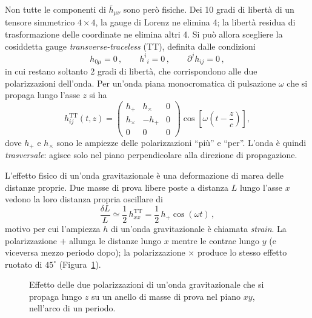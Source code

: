 Non tutte le componenti di $\bar{h}_{\mu\nu}$ sono però fisiche. Dei 10 gradi di libertà di un tensore simmetrico $4\times4$, la gauge di Lorenz ne elimina 4; la libertà residua di trasformazione delle coordinate ne elimina altri 4. Si può allora scegliere la cosiddetta gauge \textit{transverse-traceless} (TT), definita dalle condizioni~\cite{Maggiore2008}
\begin{equation}
    h_{0\mu} = 0\, , \qquad h^{i}{}_{i} = 0 \, , \qquad \partial^{j} h_{ij} = 0 \, ,
    \label{eq:gauge_TT}
\end{equation}
in cui restano soltanto 2 gradi di libertà, che corrispondono alle due polarizzazioni dell'onda. Per un'onda piana monocromatica di pulsazione $\omega$ che si propaga lungo l'asse $z$ si ha
\begin{equation}
    h_{ij}^{\mathrm{TT}}(t,z) =
    \begin{pmatrix}
        h_+ & h_\times & 0 \\
        h_\times & -h_+ & 0 \\
        0 & 0 & 0
    \end{pmatrix}
    \cos\!\left[\omega\left(t - \frac{z}{c}\right)\right] ,
    \label{eq:onda_piana_TT}
\end{equation}
dove $h_+$ e $h_\times$ sono le ampiezze delle polarizzazioni ``più'' e ``per''. L'onda è quindi \textit{trasversale}: agisce solo nel piano perpendicolare alla direzione di propagazione.

L'effetto fisico di un'onda gravitazionale è una deformazione di marea delle distanze proprie. Due masse di prova libere poste a distanza $L$ lungo l'asse $x$ vedono la loro distanza propria oscillare di
\begin{equation}
    \frac{\delta L}{L} \simeq \frac{1}{2}\, h_{xx}^{\mathrm{TT}} = \frac{1}{2}\, h_+ \cos(\omega t)\, ,
    \label{eq:strain}
\end{equation}
motivo per cui l'ampiezza $h$ di un'onda gravitazionale è chiamata \textit{strain}. La polarizzazione $+$ allunga le distanze lungo $x$ mentre le contrae lungo $y$ (e viceversa mezzo periodo dopo); la polarizzazione $\times$ produce lo stesso effetto ruotato di $45^\circ$ (Figura~\ref{fig:polarizzazioni}).

\begin{figure}[h!]
    \centering
    \caption{\footnotesize Effetto delle due polarizzazioni di un'onda gravitazionale che si propaga lungo $z$ su un anello di masse di prova nel piano $xy$, nell'arco di un periodo.}
    \label{fig:polarizzazioni}
\end{figure}

